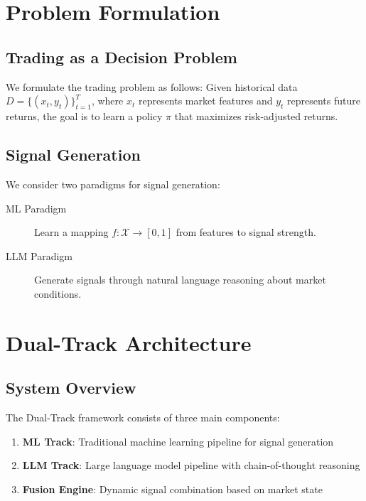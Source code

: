 
\section{Problem Formulation}

\subsection{Trading as a Decision Problem}

We formulate the trading problem as follows: Given historical data $D = \{(x_t, y_t)\}_{t=1}^{T}$, where $x_t$ represents market features and $y_t$ represents future returns, the goal is to learn a policy $\pi$ that maximizes risk-adjusted returns.

\subsection{Signal Generation}

We consider two paradigms for signal generation:

\begin{description}
    \item[ML Paradigm] Learn a mapping $f: \mathcal{X} \rightarrow [0, 1]$ from features to signal strength.
    \item[LLM Paradigm] Generate signals through natural language reasoning about market conditions.
\end{description}

\section{Dual-Track Architecture}

\subsection{System Overview}

The Dual-Track framework consists of three main components:

\begin{enumerate}
    \item \textbf{ML Track}: Traditional machine learning pipeline for signal generation
    \item \textbf{LLM Track}: Large language model pipeline with chain-of-thought reasoning
    \item \textbf{Fusion Engine}: Dynamic signal combination based on market state
\end{enumerate}

